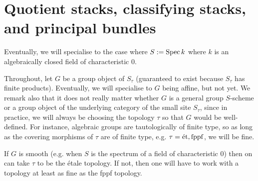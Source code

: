 \section{Quotient stacks, classifying stacks, and principal bundles}
    \begin{convention}
        Eventually, we will specialise to the case where $S := \operatorname{Spec} k$ where $k$ is an algebraically closed field of characteristic $0$.
    \end{convention}

    \begin{convention}
        Throughout, let $G$ be a group object of $S_{\tau}$ (guaranteed to exist because $S_{\tau}$ has finite products). Eventually, we will specialise to $G$ being affine, but not yet. We remark also that it does not really matter whether $G$ is a general group $S$-scheme or a group object of the underlying category of the small site $S_{\tau}$, since in practice, we will always be choosing the topology $\tau$ so that $G$ would be well-defined. For instance, algebraic groups are tautologically of finite type, so as long as the covering morphisms of $\tau$ are of finite type, e.g. $\tau = \mathrm{\acute{e}t}, \mathrm{fppf}$, we will be fine.

    \end{convention}
    \begin{remark}
        If $G$ is smooth (e.g. when $S$ is the spectrum of a field of characteristic $0$) then on can take $\tau$ to be the \'etale topology. If not, then one will have to work with a topology at least as fine as the fppf topology.
    \end{remark}

